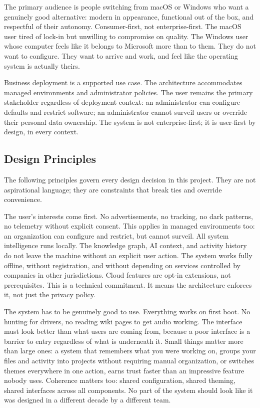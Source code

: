 The primary audience is people switching from macOS or Windows who want a
genuinely good alternative: modern in appearance, functional out of the box,
and respectful of their autonomy. Consumer-first, not enterprise-first. The
macOS user tired of lock-in but unwilling to compromise on quality. The Windows
user whose computer feels like it belongs to Microsoft more than to them. They
do not want to configure. They want to arrive and work, and feel like the
operating system is actually theirs.

Business deployment is a supported use case. The architecture accommodates
managed environments and administrator policies. The user remains the primary
stakeholder regardless of deployment context: an administrator can configure
defaults and restrict software; an administrator cannot surveil users or
override their personal data ownership. The system is not enterprise-first;
it is user-first by design, in every context.

\subsection{Design Principles}
\label{sec:principles}

The following principles govern every design decision in this project. They are
not aspirational language; they are constraints that break ties and override
convenience.

The user's interests come first. No advertisements, no tracking, no dark patterns,
no telemetry without explicit consent. This applies in managed environments too:
an organization can configure and restrict, but cannot surveil. All system
intelligence runs locally. The knowledge graph, AI context, and activity history
do not leave the machine without an explicit user action. The system works fully
offline, without registration, and without depending on services controlled by
companies in other jurisdictions. Cloud features are opt-in extensions, not
prerequisites. This is a technical commitment. It means the architecture enforces
it, not just the privacy policy.

The system has to be genuinely good to use. Everything works on first boot. No
hunting for drivers, no reading wiki pages to get audio working. The interface
must look better than what users are coming from, because a poor interface is a
barrier to entry regardless of what is underneath it. Small things matter more
than large ones: a system that remembers what you were working on, groups your
files and activity into projects without requiring manual organization, or
switches themes everywhere in one action, earns trust faster than an impressive
feature nobody uses. Coherence matters too: shared configuration, shared
theming, shared interfaces across all components. No part of the system should
look like it was designed in a different decade by a different team.

